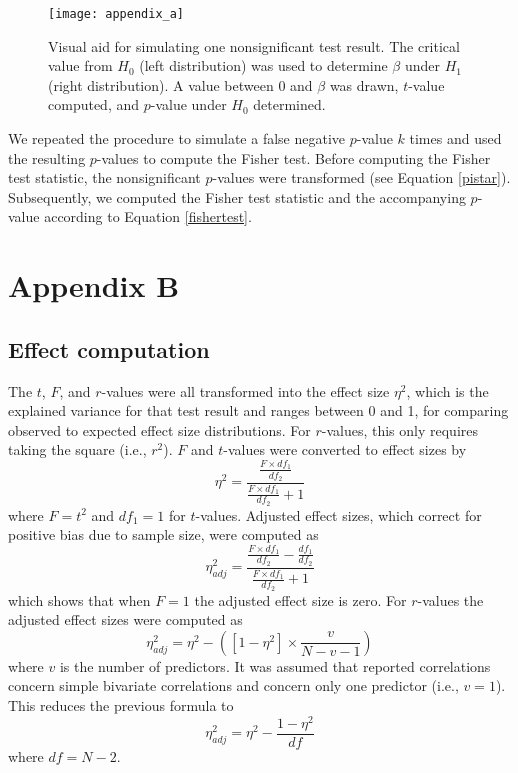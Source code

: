\documentclass{article}
\begin{document}
\begin{figure}[!ht]
\centering
\texttt{[image: appendix\_a]}
\caption{Visual aid for simulating one nonsignificant test result. The critical value from $H_0$ (left distribution) was used to determine $\beta$ under $H_1$ (right distribution). A value between 0 and $\beta$ was drawn, $t$-value computed, and $p$-value under $H_0$ determined.}
\label{fig:appendixa}
\end{figure}

We repeated the procedure to simulate a false negative $p$-value $k$ times and used the resulting $p$-values to compute the Fisher test. Before computing the Fisher test statistic, the nonsignificant $p$-values were transformed (see Equation \ref{pistar}). Subsequently, we computed the Fisher test statistic and the accompanying $p$-value according to Equation \ref{fishertest}. 

\section*{Appendix B}
\label{apB}
\subsection*{Effect computation}

The $t$, $F$, and $r$-values were all transformed into the effect size $\eta^2$, which is the explained variance for that test result and ranges between 0 and 1, for comparing observed to expected effect size distributions. For $r$-values, this only requires taking the square (i.e., $r^2$). $F$ and $t$-values were converted to effect sizes by
\begin{equation}
\eta^2=\frac{\frac{F\times df_1}{df_2}}{\frac{F\times df_1}{df_2}+1}
\label{eq:b1}
\end{equation}
where $F=t^2$ and $df_1=1$ for $t$-values. Adjusted effect sizes, which correct for positive bias due to sample size, were computed as
\begin{equation}
\eta^2_{adj}=\frac{\frac{F\times df_1}{df_2}-\frac{df_1}{df_2}}{\frac{F\times df_1}{df_2}+1}
\label{eq:b2}
\end{equation}
which shows that when $F=1$ the adjusted effect size is zero. For $r$-values the adjusted effect sizes were computed as \cite{Ivarsson2013-rm}
\begin{equation}
\eta^2_{adj}=\eta^2-([1-\eta^2]\times\frac{v}{N-v-1})
\label{eq:b3}
\end{equation}
where $v$ is the number of predictors. It was assumed that reported correlations concern simple bivariate correlations and concern only one predictor (i.e., $v=1$). This reduces the previous formula to
\begin{equation}
\eta^2_{adj}=\eta^2-\frac{1-\eta^2}{df}
\label{eq:b4}
\end{equation}
where $df=N-2$.

\end{document}
